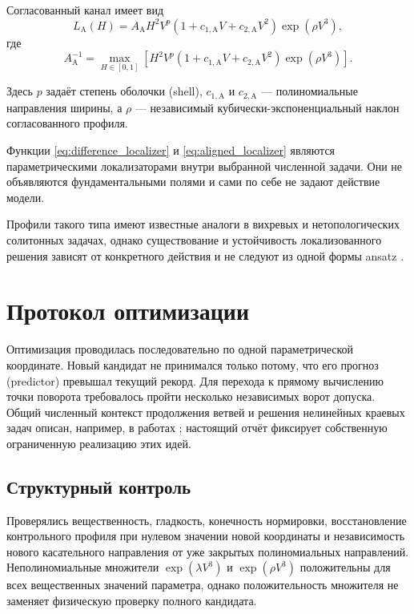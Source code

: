 \documentclass[11pt,a4paper]{article}
\newcommand{\vac}{V}
\newcommand{\host}{H}
\newcommand{\lalign}{L_{\mathrm{A}}}
\begin{document}
Согласованный канал имеет вид
\begin{equation}
\lalign(\host)
=A_{\mathrm{A}}\host^2\vac^p
\left(1+c_{1,\mathrm{A}}\vac+c_{2,\mathrm{A}}\vac^2\right)
\exp\!\left(\rho\vac^3\right),
\label{eq:aligned_localizer}
\end{equation}
где
\begin{equation}
A_{\mathrm{A}}^{-1}
=\max_{\host\in[0,1]}
\left[
\host^2\vac^p
\left(1+c_{1,\mathrm{A}}\vac+c_{2,\mathrm{A}}\vac^2\right)
\exp\!\left(\rho\vac^3\right)
\right].
\end{equation}

Здесь $p$ задаёт степень оболочки (shell), $c_{1,\mathrm{A}}$ и $c_{2,\mathrm{A}}$ --- полиномиальные направления ширины, а $\rho$ --- независимый кубически-экспоненциальный наклон согласованного профиля.

Функции \eqref{eq:difference_localizer} и \eqref{eq:aligned_localizer} являются параметрическими локализаторами внутри выбранной численной задачи. Они не объявляются фундаментальными полями и сами по себе не задают действие модели.

Профили такого типа имеют известные аналоги в вихревых и нетопологических солитонных задачах, однако существование и устойчивость локализованного решения зависят от конкретного действия и не следуют из одной формы ansatz \cite{derrick1964,nielsen1973,coleman1985}.

\section{Протокол оптимизации}

Оптимизация проводилась последовательно по одной параметрической координате. Новый кандидат не принимался только потому, что его прогноз (predictor) превышал текущий рекорд. Для перехода к прямому вычислению точки поворота требовалось пройти несколько независимых ворот допуска. Общий численный контекст продолжения ветвей и решения нелинейных краевых задач описан, например, в работах \cite{keller1977,ascher1995}; настоящий отчёт фиксирует собственную ограниченную реализацию этих идей.

\subsection{Структурный контроль}

Проверялись вещественность, гладкость, конечность нормировки, восстановление контрольного профиля при нулевом значении новой координаты и независимость нового касательного направления от уже закрытых полиномиальных направлений. Неполиномиальные множители $\exp(\lambda\vac^3)$ и $\exp(\rho\vac^3)$ положительны для всех вещественных значений параметра, однако положительность множителя не заменяет физическую проверку полного кандидата.
\end{document}
